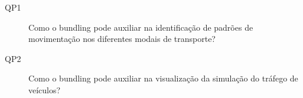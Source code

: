 \begin{description}
  \item[QP1] Como o bundling pode auxiliar na identificação de padrões de movimentação nos diferentes modais de transporte?

  \item[QP2] Como o bundling pode auxiliar na visualização da simulação do tráfego de veículos?

\end{description}


%

